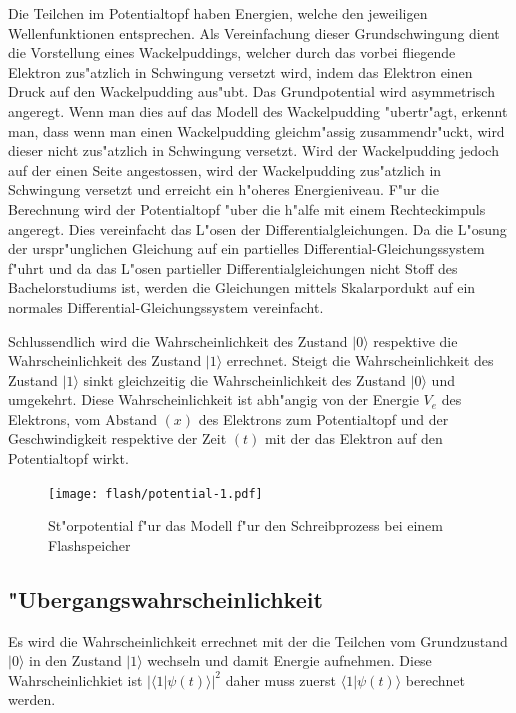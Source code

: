 \begin{refsection}
Die Teilchen im Potentialtopf haben Energien, welche den jeweiligen 
Wellenfunktionen entsprechen.
Als Vereinfachung dieser Grundschwingung dient die Vorstellung eines
Wackelpuddings, welcher durch das vorbei fliegende Elektron zus"atzlich
in Schwingung versetzt wird, indem das Elektron einen Druck auf den
Wackelpudding aus"ubt.
Das Grundpotential wird asymmetrisch angeregt.
Wenn man dies auf das Modell des Wackelpudding "ubertr"agt, erkennt man,
dass wenn man einen Wackelpudding gleichm"assig zusammendr"uckt, wird
dieser nicht zus"atzlich in Schwingung versetzt.
Wird der Wackelpudding jedoch auf der einen Seite angestossen, wird der
Wackelpudding zus"atzlich in Schwingung versetzt und erreicht ein
h"oheres Energieniveau.
F"ur die Berechnung wird der Potentialtopf "uber die h"alfe mit einem
Rechteckimpuls angeregt.
Dies vereinfacht das L"osen der Differentialgleichungen.
Da die L"osung der urspr"unglichen Gleichung auf ein partielles
Differential-Gleichungssystem f"uhrt und da das L"osen partieller
Differentialgleichungen nicht Stoff des Bachelorstudiums ist, werden
die Gleichungen mittels Skalarpordukt auf ein normales
Differential-Gleichungssystem vereinfacht.

Schlussendlich wird die Wahrscheinlichkeit des Zustand $|0\rangle$ 
respektive die Wahrscheinlichkeit des Zustand $|1\rangle$ errechnet.
Steigt die Wahrscheinlichkeit des Zustand $|1\rangle$ sinkt gleichzeitig
die Wahrscheinlichkeit des Zustand $|0\rangle$ und umgekehrt.
Diese Wahrscheinlichkeit ist abh"angig von der Energie $V_{e}$ 
des Elektrons, vom Abstand $(x)$ des Elektrons zum Potentialtopf und der 
Geschwindigkeit respektive der Zeit $(t)$ mit der das Elektron auf den 
Potentialtopf wirkt.

\begin{figure}
\centering
\texttt{[image: flash/potential-1.pdf]}
\caption{St"orpotential f"ur das Modell f"ur den Schreibprozess bei
einem Flashspeicher
\label{flash:Anregung}}
\end{figure}

\subsection{"Ubergangswahrscheinlichkeit}
Es wird die Wahrscheinlichkeit errechnet mit der die Teilchen
vom Grundzustand $|0\rangle$ in den Zustand $|1\rangle$ wechseln
und damit Energie aufnehmen. 
Diese Wahrscheinlichkiet ist $\vert\langle1|\psi(t)\rangle\vert^2$
daher muss zuerst $\langle1|\psi(t)\rangle$ berechnet werden.


\end{refsection}
